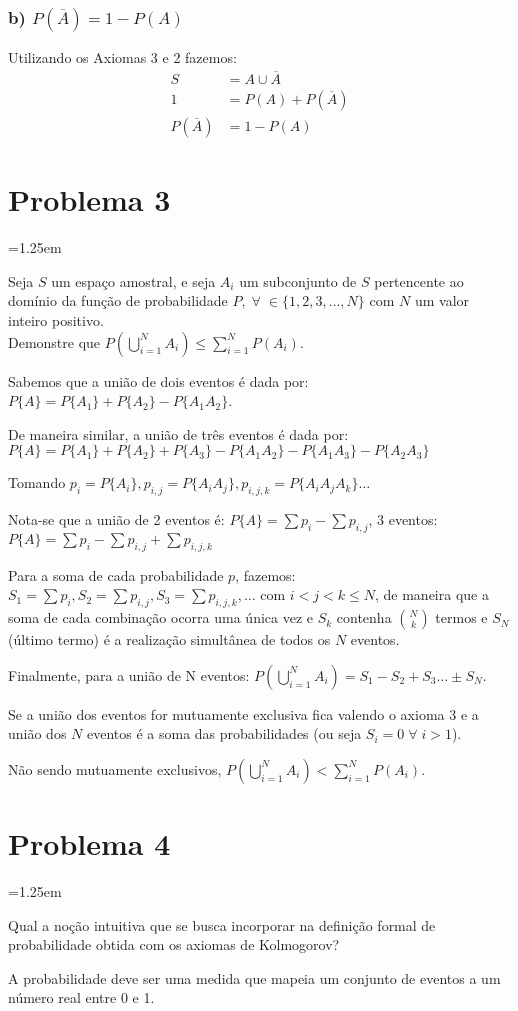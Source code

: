 \documentclass{article}
\newcommand\ov[1]{\overline{#1}}
\newenvironment{nscenter}
 {\parskip=1.25em\par\nopagebreak\centering}
 {\par\noindent\ignorespacesafterend}
\begin{document}
\subsubsection*{b) $P(\ov{A}) = 1 - P(A)$}
Utilizando os Axiomas 3 e 2 fazemos:
\begin{align*}
    S &= A \cup \ov{A} \\
    1 &= P(A) + P(\ov{A}) \\
    P(\ov{A}) &= 1 - P(A)
\end{align*}

\section*{Problema 3}
\begin{nscenter}
Seja $S$ um espaço amostral, e seja $A_i$ um subconjunto de $S$ pertencente ao domínio da função de probabilidade $P, \; \forall \; \in \{1,2,3,\ldots,N\}$ com $N$ um valor inteiro positivo.
\\
Demonstre que $P(\bigcup^N_{i=1} A_i) \leq \sum^N_{i=1} P(A_i)$.
\end{nscenter}
Sabemos que a união de dois eventos é dada por: $P\{A\} = P\{A_1\} + P\{A_2\} - P\{A_1 A_2\}$.

De maneira similar, a união de três eventos é dada por: $P\{A\} = P\{A_1\} + P\{A_2\} + P\{A_3\}
- P\{A_1 A_2\} - P\{A_1 A_3\} - P\{A_2 A_3\}$

Tomando $p_i = P\{A_i\}, p_{i,j} = P\{A_i A_j\}, p_{i,j,k} = P\{A_i A_j A_k\} \ldots$

Nota-se que a união de 2 eventos é: $P\{A\} = \sum p_i - \sum p_{i,j}$, 3 eventos: $P\{A\} = \sum p_i - \sum p_{i,j} + \sum p_{i,j,k}$

Para a soma de cada probabilidade $p$, fazemos: $S_1 = \sum p_i, S_2 = \sum p_{i,j}, S_3 = \sum
p_{i,j,k}, \ldots$ com $i < j < k \leq N$, de maneira que a soma de cada combinação ocorra uma
única vez e $S_k$ contenha ${N \choose k}$ termos e $S_N$ (último termo) é a realização simultânea
de todos os $N$ eventos.

Finalmente, para a união de N eventos: $P(\bigcup_{i=1}^N A_i) = S_1 - S_2 + S_3 \ldots \pm
S_N$.

Se a união dos eventos for mutuamente exclusiva fica valendo o axioma 3 e a união dos $N$
eventos é a soma das probabilidades (ou seja $S_i = 0 \; \forall \; i > 1$).

Não sendo mutuamente exclusivos, $P(\bigcup_{i=1}^N A_i) < \sum_{i=1}^N P(A_i)$.

\section*{Problema 4}
\begin{nscenter}
Qual a noção intuitiva que se busca incorporar na definição formal de probabilidade obtida com os
axiomas de Kolmogorov?
\end{nscenter}
A probabilidade deve ser uma medida que mapeia um conjunto de eventos a um número real entre 0 e
1.
\end{document}
